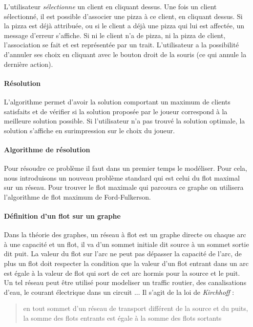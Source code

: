 		L'utilisateur \emph{sélectionne} un client en cliquant dessus.
		    Une fois un client sélectionné, il est possible
		    d'associer une pizza à ce client, en cliquant dessus.
		    Si la pizza est déjà attribuée, ou si le client a déjà
		    une pizza qui lui est affectée, un message d'erreur s'affiche.
		    Si ni le client n'a de pizza, ni la pizza de client, l'association
		    se fait et est représentée par un trait.
		L'utilisateur a la possibilité d'annuler ses choix en cliquant avec le bouton
		    droit de la souris (ce qui annule la dernière action).
		\paragraph{Résolution}
			L'algorithme permet d'avoir la solution comportant un maximum de clients
			 satisfaits et de vérifier si la solution proposée par le joueur correspond
			 à la meilleure solution possible.
 			Si l'utilisateur n'a pas trouvé la solution optimale, la solution s'affiche
			 en surimpression sur le choix du joueur.
            

		\paragraph{Algorithme de résolution}
			Pour résoudre ce problème il faut dans un premier temps le modéliser.
            Pour cela, nous introduisons un nouveau problème standard qui est celui du flot maximal sur un
            réseau. Pour trouver le flot maximale qui parcoura ce graphe on utilisera l'algorithme de flot
             maximum de Ford-Fulkerson.

        \paragraph{Définition d’un flot sur un graphe}

	    Dans la théorie des graphes, un réseau à flot est un graphe directe ou chaque arc à une capacité et un flot, il va d'un sommet initiale dit source à un sommet sortie dit puit. 
	    La valeur du flot sur l'arc ne peut pas dépasser la capacité de l'arc, de plus un flot doit respecter la condition que la valeur d'un flot entrant dans un arc 
	    est égale à la valeur de flot qui sort de cet arc hormis pour la source et le puit. Un tel réseau peut être utilisé pour modeliser un traffic routier, des canalisations d'eau,
	    le courant électrique dans un circuit ...
\newline
	    Il s'agit de la loi de \emph{Kirchhoff} : 
\begin{quote}

en tout sommet d’un réseau de transport
différent de la source et du puits, la somme des flots
entrants est égale à la somme des flots sortants 
 
\end{quote}

